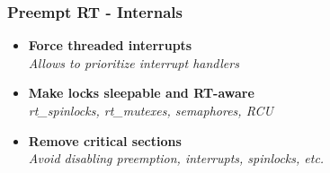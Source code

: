 \begin{frame}
	\frametitle{Preempt RT - Internals}
	\begin{itemize}
		\item \textbf{Force threaded interrupts} \\ {\small{\textit{Allows to prioritize interrupt handlers}}}
		\item \textbf{Make locks sleepable and RT-aware} \\ {\small{\textit{rt\_spinlocks, rt\_mutexes, semaphores, RCU}}}
		\item \textbf{Remove critical sections} \\ {\small{\textit{Avoid disabling preemption, interrupts, spinlocks, etc.}}}
	\end{itemize}
\end{frame}

